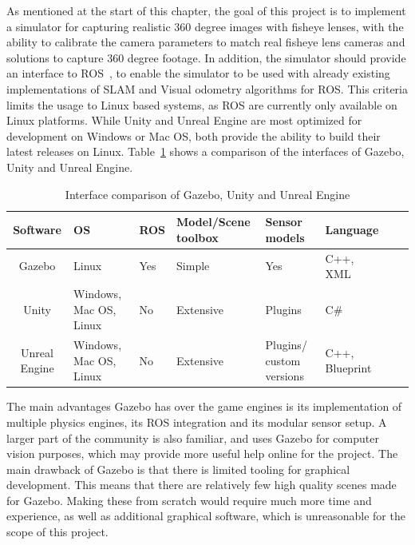 As mentioned at the start of this chapter, the goal of this project is to implement a simulator for capturing realistic 360 degree images with fisheye lenses, with the ability to calibrate the camera parameters to match real fisheye lens cameras and solutions to capture 360 degree footage. In addition, the simulator should provide an interface to ROS~\cite{ROSpaper}, to enable the simulator to be used with already existing implementations of SLAM and Visual odometry algorithms for ROS. This criteria limits the usage to Linux based systems, as ROS are currently only available on Linux platforms. While Unity and Unreal Engine are most optimized for development on Windows or Mac OS, both provide the ability to build their latest releases on Linux. Table~\ref{tab:comparison_interface} shows a comparison of the interfaces of Gazebo, Unity and Unreal Engine.

\begin{table}[!htb]
    \centering
    \begin{tabular}{|c|>{\centering\arraybackslash}m{2cm}|>{\centering\arraybackslash}m{2cm}|>{\centering\arraybackslash}m{2.8cm}|>{\centering\arraybackslash}m{2cm}|>{\centering\arraybackslash}m{2cm}|>{\centering\arraybackslash}m{2cm}|>{\centering\arraybackslash}m{2cm}|} \hline
        \textbf{Software}          & \textbf{OS}  & \textbf{ROS} & \textbf{Model/Scene toolbox}   & \textbf{Sensor models} & \textbf{Language}              \\ \hline \hline
        Gazebo          & Linux           & Yes           & Simple  & Yes & C++, XML                 \\ \hline
        Unity           & Windows, Mac OS, Linux                    & No            & Extensive & Plugins & C\# \\ \hline
        Unreal Engine   & Windows, Mac OS, Linux  & No            & Extensive & Plugins/ custom versions & C++, Blueprint \\ \hline
    \end{tabular}
    \caption{Interface comparison of Gazebo, Unity and Unreal Engine}
    \label{tab:comparison_interface}
\end{table}

The main advantages Gazebo has over the game engines is its implementation of multiple physics engines, its ROS integration and its modular sensor setup. A larger part of the community is also familiar, and uses Gazebo for computer vision purposes, which may provide more useful help online for the project. The main drawback of Gazebo is that there is limited tooling for graphical development. This means that there are relatively few high quality scenes made for Gazebo. Making these from scratch would require much more time and experience, as well as additional graphical software, which is unreasonable for the scope of this project. 


